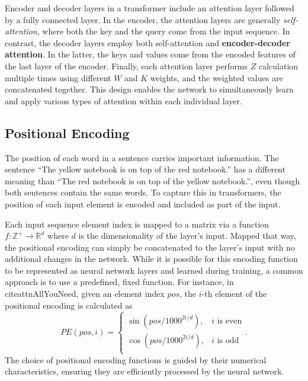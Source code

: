  Encoder and decoder layers in a transformer include an attention layer followed by a fully connected layer. In the encoder, the attention layers are generally \textit{self-attention}, where both the key and the query come from the input sequence. In contrast, the decoder layers employ both self-attention and \textbf{encoder-decoder attention}. In the latter, the keys and values come from the encoded features of the last layer of the encoder. Finally, each attention layer performs $Z$ calculation multiple times using different $W$ and $K$ weights, and the weighted values are concatenated together. This design enables the network to simultaneously learn and apply various types of attention within each individual layer.
 
 \subsection{Positional Encoding}
 
The position of each word in a sentence carries important information. The sentence ``The yellow notebook is on top of the red notebook.'' has a different meaning than ``The red notebook is on top of the yellow notebook.'', even though both sentences contain the same words. To capture this in transformers, the position of each input element is encoded and included as part of the input.
 
Each input sequence element index is mapped to a matrix via a function $f : \mathbb{Z}^{+} \rightarrow \mathbb{R}^d$ where $d$ is the dimensionality of the layer's input. Mapped that way, the positional encoding can simply be concatenated to the layer's input with no additional changes in the network. While it is possible for this encoding function to be represented as neural network layers and learned during training, a common approach is to use a predefined, fixed function. For instance, in cite{attnAllYouNeed}, given an element index $pos$, the $i$-th element of the positional encoding is calculated as
\begin{equation}
PE(pos, i) = \begin{cases}
	\sin(pos/1000^{2i/d}), & \text{$i$ is even}\\
	\cos(pos/1000^{2i/d}), & \text{$i$ is odd}\\
\end{cases}.
\end{equation}
The choice of positional encoding functions is guided by their numerical characteristics, ensuring they are efficiently processed by the neural network.
  
